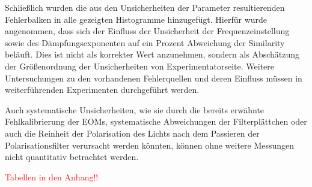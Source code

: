 Schließlich wurden die aus den Unsicherheiten der Parameter resultierenden 
Fehlerbalken in alle gezeigten Histogramme hinzugefügt. Hierfür wurde
angenommen, dass sich der Einfluss der Unsicherheit der Frequenzeinstellung
sowie des Dämpfungsexponenten auf ein Prozent Abweichung der Similarity
beläuft. Dies ist nicht als korrekter Wert anzunehmen, sondern als Abschätzung
der Größenordnung der Unsicherheiten von Experimentatorseite. Weitere
Untersuchungen zu den vorhandenen Fehlerquellen und deren Einfluss müssen in
weiterführenden Experimenten durchgeführt werden.

Auch systematische Unsicherheiten, wie sie durch die bereits erwähnte
Fehlkalibrierung der EOMs, systematische Abweichungen der Filterplättchen oder
auch die Reinheit der Polarisation des Lichts nach dem Passieren der
Polarisationsfilter verursacht werden könnten, können ohne weitere Messungen
nicht quantitativ betrachtet werden.

\textcolor{red}{\Huge{Tabellen in den Anhang!!}}